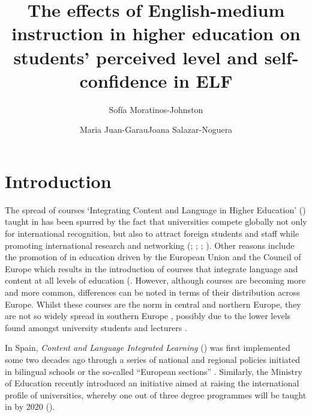 \documentclass[output=paper]{langsci/langscibook}
\author{Sofía Moratinos-Johnston\affiliation{University of the Balearic Islands }\and Maria Juan-Garau\affiliation{University of the Balearic Islands }\lastand Joana Salazar-Noguera\affiliation{University of the Balearic Islands }}
\title{The effects of English-medium instruction in higher education on students' perceived level and self-confidence in ELF}
\begin{document}
 

\section{Introduction} 

The spread of courses ‘Integrating Content and Language in Higher Education’ () taught in  has been spurred by the fact that universities compete globally not only for international recognition, but also to attract foreign students and staff while promoting international research and networking (\citealt{Coleman2006}; \citealt{Graddol2006}; \citealt{Lasagabaster2015}; \citealt{Pérez-Vidal2015forall}). Other reasons include the promotion of  in education driven by the European Union and the Council of Europe which results in the introduction of courses that integrate language and content at all levels of education (\cite{EuropeanHigherEducationArea2009}. However, although  courses are becoming more and more common, differences can be noted in terms of their distribution across Europe. Whilst these courses are the norm in central and northern Europe, they are not so widely spread in southern Europe \citep{WächterMaiworm2014}, possibly due to the lower  levels found amongst university students and lecturers \citep{Cots2013,Arnó-MaciàMancho-Barés2015}. 



In Spain, \textit{Content and Language Integrated Learning} () was first implemented some two decades ago through a series of national and regional policies initiated in bilingual schools or the so-called ``European sections'' \citep{Cañado2010,Juan-GarauSalazar-Noguera2015}. Similarly, the  Ministry of Education recently introduced an initiative aimed at raising the international profile of  universities, whereby one out of three degree programmes will be taught in  by 2020 (\citealt{SpanishMinistryofEducation2015}). 
\end{document}
